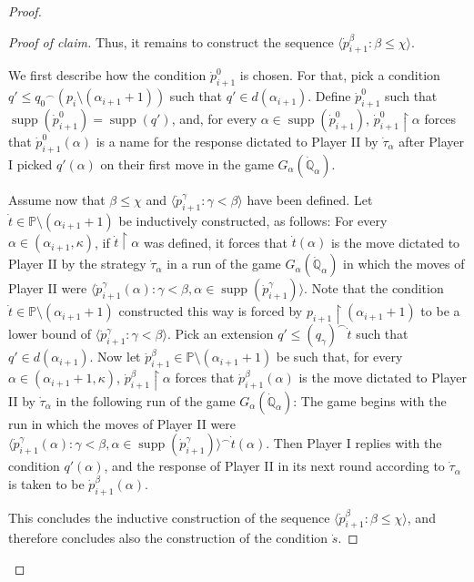 \documentclass[10pt,a4paper]{amsart}
\newcommand{\la}{\langle}
\newcommand{\po}{\mathbb{P}}
\newcommand{\qo}{\mathbb{Q}}
\newcommand{\ra}{\rangle}
\renewcommand{\restriction}{\mathbin\upharpoonright}    %
\DeclareMathOperator{\supp}{supp}
\begin{document}
\begin{proof}
\begin{proof}[Proof of claim]
   
   Thus, it remains to construct the sequence $\langle \dot{p}_{i+1}^\beta\colon \beta\leq \chi\rangle$.

   We first describe how the condition $\dot{p}^0_{i+1}$ is chosen. For that, pick a condition $q'\leq {q_0}^{\frown} (p_i\setminus (\alpha_{i+1}+1))$ such that $q'\in d(\alpha_{i+1})$. Define $\dot{p}^0_{i+1}$ such that $\supp(\dot{p}^0_{i+1}) = \supp(q')$, and, for every $\alpha\in \supp(\dot{p}^0_{i+1})$, $\dot{p}^0_{i+1}\restriction \alpha$ forces that $\dot{p}^0_{i+1}(\alpha)$ is a name for the response dictated to Player II by $\dot{\tau}_\alpha$ after Player I picked $q'(\alpha)$ on their first move in the game $G_\alpha(\dot{\qo}_\alpha)$. 

   Assume now that $\beta\leq \chi$ and $\la \dot{p}^\gamma_{i+1} \colon \gamma<\beta \ra$ have been defined. Let $\dot{t}\in \po\setminus (\alpha_{i+1}+1)$ be inductively constructed, as follows: For every $\alpha\in (\alpha_{i+1}, \kappa)$, if $\dot{t}\restriction \alpha$ was defined, it forces that $\dot{t}(\alpha)$ is the move dictated to Player II by the strategy $\dot{\tau}_\alpha$ in a run of the game $G_{\alpha}(\dot{\qo}_\alpha)$ in which the moves of Player II were $\la \dot{p}^\gamma_{i+1}(\alpha) \colon \gamma<\beta, \alpha\in \supp(\dot{p}^\gamma_{i+1}) \ra$. Note that the condition $\dot{t}\in \po\setminus (\alpha_{i+1}+1)$ constructed this way is forced by $p_{i+1}\restriction (\alpha_{i+1}+1)$ to be a lower bound of $\la  \dot{p}^\gamma_{i+1} \colon \gamma<\beta\ra$. Pick an extension $q'\leq (q_{\gamma})^{\frown} \dot{t}$ such that $q'\in d(\alpha_{i+1})$. Now let $\dot{p}^{\beta}_{i+1}\in \po\setminus (\alpha_{i+1}+1)$ be such that, for every $\alpha\in (\alpha_{i+1}+1, \kappa)$, $\dot{p}^\beta_{i+1}\restriction \alpha$ forces that $\dot{p}^\beta_{i+1}(\alpha)$ is the move dictated to Player II by $\dot{\tau}_\alpha$ in the following run of the game $G_\alpha(\dot{\qo}_\alpha)$: The game begins with the run in which the moves of Player II were $\la \dot{p}^\gamma_{i+1}(\alpha) \colon \gamma<\beta, \alpha\in \supp(\dot{p}^\gamma_{i+1}) \ra^{\frown} \dot{t}(\alpha)$. Then Player I replies with the condition $q'(\alpha)$, and the response of Player II in its next round according to $\dot{\tau}_\alpha$ is taken to be $\dot{p}^\beta_{i+1}(\alpha)$.  

   This concludes the inductive construction of  the sequence $\la \dot{p}^\beta_{i+1} \colon \beta\leq \chi \ra$, and therefore concludes also the construction of the condition $\dot{s}$.
 

\end{proof}
\end{proof}
\end{document}
